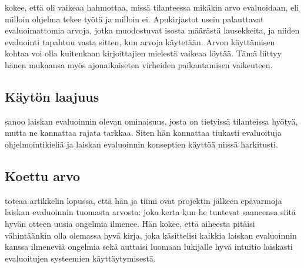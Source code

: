 \citet{sampson2009experience} kokee, että oli vaikeaa hahmottaa, missä tilanteessa mikäkin arvo evaluoidaan, eli milloin ohjelma tekee työtä ja milloin ei. Apukirjastot usein palauttavat evaluoimattomia arvoja, jotka muodostuvat isosta määrästä lausekkeita, ja niiden evaluointi tapahtuu vasta sitten, kun arvoja käytetään. Arvon käyttämisen kohtaa voi olla kuitenkaan kirjoittajien mielestä vaikeaa löytää. Tämä liittyy hänen mukaansa myös ajonaikaiseten virheiden paikantamisen vaikeuteen.

\subsection{Käytön laajuus}
\citet{vesakarvonen} sanoo laiskan evaluoinnin olevan ominaisuus, josta on tietyissä tilanteissa hyötyä, mutta ne kannattaa rajata tarkkaa. Siten hän kannattaa tiukasti evaluoituja ohjelmointikieliä ja laiskan evaluoinnin konseptien käyttöä niissä harkitusti.

\subsection{Koettu arvo}

\citet{sampson2009experience} toteaa artikkelin lopussa, että hän ja tiimi ovat projektin jälkeen epävarmoja laiskan evaluoinnin tuomasta arvosta: joka kerta kun he tuntevat saaneensa siitä hyvän otteen uusia ongelmia ilmenee. Hän kokee, että aiheesta pitäisi vähintäänkin olla olemassa hyvä kirja, joka käsittelisi kaikkia laiskan evaluoinnin kanssa ilmeneviä ongelmia sekä auttaisi luomaan lukijalle hyvä intuitio laiskasti evaluoitujen systeemien käyttäytymisestä.
